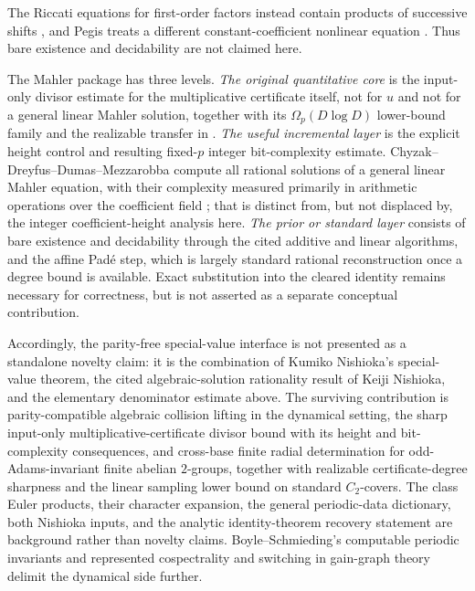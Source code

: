 The Riccati equations for first-order factors instead contain products of
successive shifts
\cite{ChyzakDreyfusDumasMezzarobba2025FirstOrderFactors}, and Pegis treats a
different constant-coefficient nonlinear equation
\cite{Pegis1996NonlinearMahler}.  Thus bare existence and decidability are not
claimed here.

The Mahler package has three levels.  \emph{The original quantitative core}
is the input-only divisor estimate for the multiplicative certificate itself,
not for \(u\) and not for a general linear Mahler solution, together with its
\(\Omega_p(D\log D)\) lower-bound family and the realizable transfer in
.  \emph{The useful
incremental layer} is the explicit height control and resulting fixed-\(p\)
integer bit-complexity estimate.  Chyzak--Dreyfus--Dumas--Mezzarobba compute
all rational solutions of a general linear Mahler equation, with their
complexity measured primarily in arithmetic operations over the coefficient
field \cite{ChyzakDreyfusDumasMezzarobba2018MahlerSolutions}; that is distinct
from, but not displaced by, the integer coefficient-height analysis here.
\emph{The prior or standard layer} consists of bare existence and decidability
through the cited additive and linear algorithms, and the affine Pad\'e step,
which is largely standard rational reconstruction once a degree bound is
available.  Exact substitution into the cleared identity remains necessary
for correctness, but is not asserted as a separate conceptual contribution.

Accordingly, the parity-free special-value interface is not presented as a
standalone novelty claim: it is the combination of Kumiko Nishioka's
special-value theorem, the cited algebraic-solution rationality result of
Keiji Nishioka, and the elementary denominator estimate above.  The surviving
contribution is parity-compatible algebraic collision lifting in the
dynamical setting, the sharp input-only multiplicative-certificate divisor
bound with its height and bit-complexity consequences, and cross-base finite
radial determination for odd-Adams-invariant finite abelian \(2\)-groups,
together with realizable certificate-degree sharpness and the linear sampling
lower bound on standard \(C_2\)-covers.  The
class Euler products, their character expansion, the general periodic-data
dictionary, both Nishioka inputs, and the analytic identity-theorem recovery
statement are background rather than novelty claims.  Boyle--Schmieding's computable periodic invariants
\cite{BoyleSchmieding2017FiniteGroupExtensions} and represented
cospectrality and switching in gain-graph theory
\cite{Zaslavsky1989BiasedGraphs,CavaleriDAngeliDonno2021BalanceGainGraphs,
CavaleriDonno2022Cospectrality} delimit the dynamical side further.

